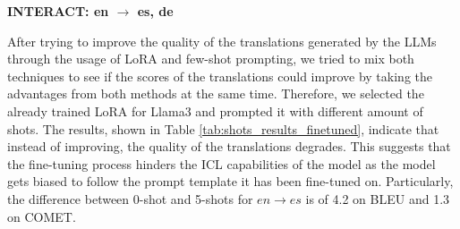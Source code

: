 \documentclass[11pt,english,listoffigures,listoftables]{tfgetsinf}
\begin{document}
\begin{table}[h]
    \centering
    \caption{BLEU and COMET scores for Llama3 base model with few-shot prompting on INTERACT test set.}
    \label{tab:shots_results_base}
    \textbf{INTERACT: en $\rightarrow$ es, de \\}
\end{table}

After trying to improve the quality of the translations generated by the LLMs through the usage of LoRA and few-shot prompting, we tried to mix both techniques to see if the scores of the translations could improve by taking the advantages from both methods at the same time. Therefore, we selected the already trained LoRA for Llama3 and prompted it with different amount of shots. The results, shown in Table \ref{tab:shots_results_finetuned}, indicate that instead of improving, the quality of the translations degrades. This suggests that the fine-tuning process hinders the ICL capabilities of the model as the model gets biased to follow the prompt template it has been fine-tuned on. Particularly, the difference between 0-shot and 5-shots for $en \rightarrow es$ is of 4.2 on BLEU and 1.3 on COMET.
 
\end{document}
